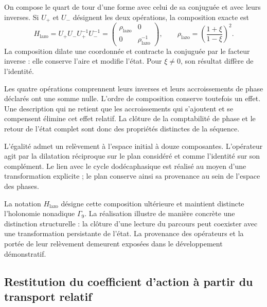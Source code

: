 On compose le quart de tour d’une forme avec celui de sa conjuguée et avec
leurs inverses. Si $U_+$ et $U_-$ désignent les deux opérations, la
composition exacte est
\begin{equation}
 \boxed{
 H_{\mathrm{lazo}}=U_+U_-U_+^{-1}U_-^{-1}
 =\begin{pmatrix}\rho_{\mathrm{lazo}}&0\\[2pt]
                  0&\rho_{\mathrm{lazo}}^{-1}\end{pmatrix},
 \qquad
 \rho_{\mathrm{lazo}}=
 \left(\frac{1+\xi}{1-\xi}\right)^2.}
 \label{eq:narrativa-holonomia-lazo}
\end{equation}
La composition dilate une coordonnée et contracte la conjuguée par le facteur
inverse : elle conserve l’aire et modifie l’état. Pour $\xi\ne0$, son
résultat diffère de l’identité.

Les quatre opérations comprennent leurs inverses et leurs accroissements de phase
déclarés ont une somme nulle. L’ordre de composition conserve toutefois un
effet. Une description qui ne retient que les accroissements qui s’ajoutent et
se compensent élimine cet effet relatif. La clôture de la comptabilité
de phase et le retour de l’état complet sont donc des propriétés
distinctes de la séquence.

L’égalité admet un relèvement à l’espace initial à douze
composantes. L’opérateur agit par la dilatation réciproque sur le
plan considéré et comme l’identité sur son complément. Le lien avec
le cycle dodécaphasique est réalisé au moyen d’une transformation explicite ;
le plan conserve ainsi sa provenance au sein de l’espace des phases.

La notation $H_{\mathrm{lazo}}$ désigne cette composition ultérieure et
maintient distincte l’holonomie nonadique $\Gamma_9$. La réalisation
illustre de manière concrète une distinction structurelle : la clôture d’une
lecture du parcours peut coexister avec une transformation persistante
de l’état. La provenance des opérateurs et la portée de leur
relèvement demeurent exposées dans le développement démonstratif.

\subsection{Restitution du coefficient d’action à partir du transport relatif}
\label{subsec:narrativa-restitucion-accion}

